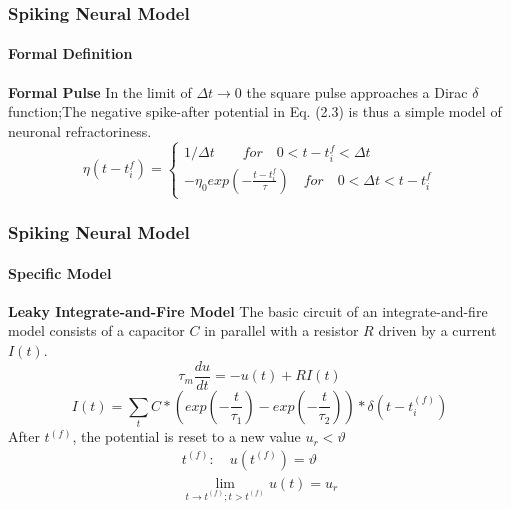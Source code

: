 \documentclass[10pt,aspectratio=43,mathserif, notes]{beamer}
\begin{document}
		\begin{frame}
            \frametitle{\textbf{Spiking Neural Model}}
            \framesubtitle{Formal Definition}
	        \begin{block}{\textbf{Formal Pulse}}
            In the limit of $\Delta t \rightarrow 0$ the square pulse approaches a Dirac $\delta$ function;The negative spike-after potential in Eq. (2.3) is thus a simple model of neuronal refractoriness.
            \begin{equation}
                \eta(t-t_i^{f})=\left\{
                \begin{array}{lr}
                1/\Delta t \quad \quad for \quad 0<t-t_i^{f}< \Delta t\\
                -\eta_0exp(-\frac{t-t_i^{f}}{\tau})\quad for \quad 0< \Delta t<t-t_i^{f}
                \end{array}
                \right.
            \end{equation}
            \end{block}

		\end{frame}
		\begin{frame}
		    \frametitle{\textbf{Spiking Neural Model}}
            \framesubtitle{Specific Model}
            \begin{block}{\textbf{Leaky Integrate-and-Fire Model}}
            The basic circuit of an integrate-and-fire model consists of a capacitor $C$ in parallel with a resistor $R$ driven by a current $I(t)$.
            \begin{equation}
                \tau_m \frac {du}{dt}=-u(t)+RI(t)
            \end{equation}
            \begin{equation}
                I(t)  =\sum \limits_{t} C*(exp(- \frac{t}{\tau_1})-exp(-\frac{t}{\tau_2}))*\delta(t - t_i^{(f)})
            \end{equation}
            After $t^{(f)}$, the potential is reset to a new value $u_r<\vartheta$
            \begin{equation}
            \begin{split}
                t^{(f)}:\quad u(t^{(f)}) = \vartheta \\
                \lim_{t \rightarrow t^{(f)};t>t^{(f)}} u(t) = u_r
            \end{split}
            \end{equation}
            \end{block}
		\end{frame}
\end{document}
